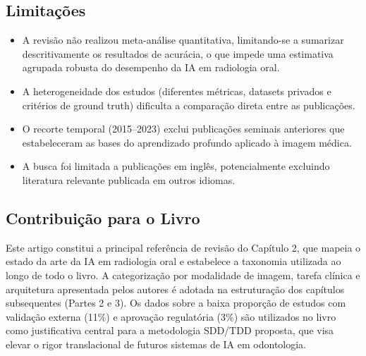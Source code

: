 \subsection{Limitações}
\begin{itemize}
  \item A revisão não realizou meta-análise quantitativa, limitando-se a
        sumarizar descritivamente os resultados de acurácia, o que impede
        uma estimativa agrupada robusta do desempenho da IA em radiologia
        oral.
  \item A heterogeneidade dos estudos (diferentes métricas, datasets
        privados e critérios de ground truth) dificulta a comparação direta
        entre as publicações.
  \item O recorte temporal (2015--2023) exclui publicações seminais
        anteriores que estabeleceram as bases do aprendizado profundo
        aplicado à imagem médica.
  \item A busca foi limitada a publicações em inglês, potencialmente
        excluindo literatura relevante publicada em outros idiomas.
\end{itemize}

\subsection{Contribuição para o Livro}
Este artigo constitui a principal referência de revisão do Capítulo 2, que
mapeia o estado da arte da IA em radiologia oral e estabelece a taxonomia
utilizada ao longo de todo o livro. A categorização por modalidade de
imagem, tarefa clínica e arquitetura apresentada pelos autores é adotada
na estruturação dos capítulos subsequentes (Partes 2 e 3). Os dados sobre
a baixa proporção de estudos com validação externa (11\%) e aprovação
regulatória (3\%) são utilizados no livro como justificativa central para
a metodologia SDD/TDD proposta, que visa elevar o rigor translacional de
futuros sistemas de IA em odontologia.

